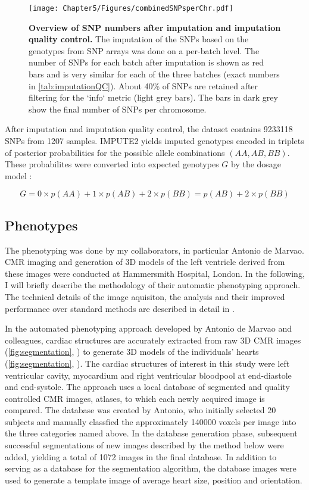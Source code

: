 \begin{figure}[hbtp]
	\centering
	\texttt{[image: Chapter5/Figures/combinedSNPsperChr.pdf]}
	\caption[\textbf{Overview of SNP numbers after imputation and imputation quality control. }]{\textbf{Overview of SNP numbers after imputation and imputation quality control. } The imputation of the SNPs based on the genotypes from SNP arrays was done on a per-batch level. The number of SNPs for each batch after imputation is shown as red bars and is very similar for each of the three batches (exact numbers in \cref{tab:imputationQC}). About \num{40}\% of SNPs are retained after filtering for the `info` metric (light grey bars). The bars in dark grey show the final number of SNPs per chromosome. }
 	\label{fig:imputeQC}
\end{figure}
%
After imputation and imputation quality control, the dataset contains \num{9233118} SNPs from \num{1207} samples. IMPUTE2 yields imputed genotypes encoded in triplets of posterior probabilities for the possible allele combinations \((AA, AB, BB)\). These probabilites were converted into expected genotypes \(G\) by the dosage model \citep{Howie2011}:

\begin{equation}
	G = 0 \times p(AA) + 1 \times p(AB) + 2 \times p(BB) = p(AB) + 2 \times p(BB)
\end{equation}


\subsection{Phenotypes}
\label{subsection:phentoypes}
The phenotyping was done by my collaborators, in particular Antonio de Marvao. CMR imaging and generation of 3D models of the left ventricle derived from these images were conducted at Hammersmith Hospital, London. In the following, I will briefly describe the methodology of their automatic phenotyping approach. The technical details of the image aquisiton, the analysis and their improved performance over standard methods are described in detail in \citep{deMarvao2014}. 

In the automated phenotyping approach developed by Antonio de Marvao and colleagues, cardiac structures are accurately extracted from raw 3D CMR images (\cref{fig:segmentation}, ) to generate 3D models of the individuals' hearts  (\cref{fig:segmentation}, ). The cardiac structures of interest in this study were left ventricular cavity, myocardium and right ventricular bloodpool at end-diastole and end-systole. The approach uses a local database of segmented and quality controlled CMR images, atlases, to which each newly acquired image is compared. The database was created by Antonio, who initially selected \num{20} subjects and manually classfied the approximately \num{140000} voxels per image into the three categories named above. In the database generation phase, subsequent successful segmentations of new images described by the method below were added, yielding a total of \num{1072} images in the final database. In addition to serving as a database for the segmentation algorithm, the database images were used to generate a template image of average heart size, position and orientation. 


